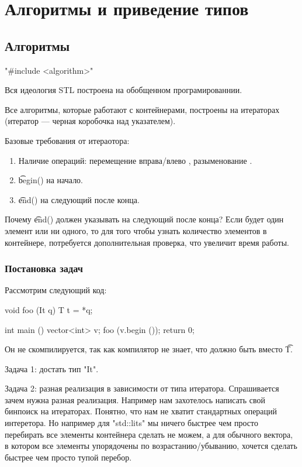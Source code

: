 
\chapter{Алгоритмы и приведение типов}
\section{Алгоритмы}

\cpp"#include <algorithm>"

Вся идеология STL построена на обобщенном програмированнии. 

Все алгоритмы, которые работают с контейнерами, построены на итераторах (итератор --- черная коробочка над указателем).

Базовые требования от итераотора:
\begin{enumerate}
	\item Наличие операций: перемещение вправа/влево \cpp{--, ++}, разыменование \cpp{*->, *}. 
	\item \t{begin()} на начало.
	\item \t{end()} на следующий после конца.
\end{enumerate}

Почему \t{end()} должен указывать на следующий после конца? 
Если будет один элемент или ни одного, то для того чтобы узнать количество элементов в контейнере, потребуется дополнительная проверка, что увеличит время работы. 

\subsection{Постановка задач}

Рассмотрим следующий код:
\begin{cppcode}
void foo (It q){
	T t = *q;
}

int main () {
	vector<int> v;
	foo (v.begin ());
	return 0; 
}
\end{cppcode}
Он не скомпилируется, так как компилятор не знает, что должно быть вместо \t{T}.

Задача 1: достать тип \cpp"It". 

Задача 2: разная реализация в зависимости от типа итератора.
Спрашивается зачем нужна разная реализация. 
Например нам захотелось написать свой бинпоиск на итераторах. 
Понятно, что нам не хватит стандартных операций интеретора. 
Но например для \cpp"std::lits" мы ничего быстрее чем просто перебирать все элементы контейнера сделать не можем, а для обычного вектора, в котором все элементы упорядочены по возрастанию/убыванию, хочется сделать быстрее чем просто тупой перебор. 

